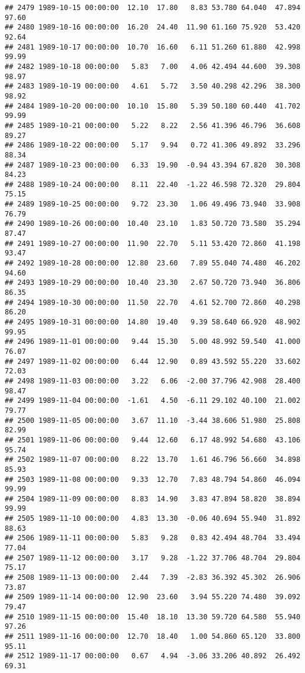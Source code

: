 \documentclass{article}\usepackage{graphicx, color}
\makeatletter
\newenvironment{kframe}{%
 \def\at@end@of@kframe{}%
 \ifinner\ifhmode%
  \def\at@end@of@kframe{\end{minipage}}%
  \begin{minipage}{\columnwidth}%
 \fi\fi%
 \def\FrameCommand##1{\hskip\@totalleftmargin \hskip-\fboxsep
 \colorbox{shadecolor}{##1}\hskip-\fboxsep
     \hskip-\linewidth \hskip-\@totalleftmargin \hskip\columnwidth}%
 \MakeFramed {\advance\hsize-\width
   \@totalleftmargin\z@ \linewidth\hsize
   \@setminipage}}%
 {\par\unskip\endMakeFramed%
 \at@end@of@kframe}
\newenvironment{knitrout}{}{} %
\makeatother
\begin{document}
\begin{knitrout}
\begin{kframe}
\begin{verbatim}
## 2479 1989-10-15 00:00:00  12.10  17.80   8.83 53.780 64.040  47.894  97.60
## 2480 1989-10-16 00:00:00  16.20  24.40  11.90 61.160 75.920  53.420  92.64
## 2481 1989-10-17 00:00:00  10.70  16.60   6.11 51.260 61.880  42.998  99.99
## 2482 1989-10-18 00:00:00   5.83   7.00   4.06 42.494 44.600  39.308  98.97
## 2483 1989-10-19 00:00:00   4.61   5.72   3.50 40.298 42.296  38.300  98.92
## 2484 1989-10-20 00:00:00  10.10  15.80   5.39 50.180 60.440  41.702  99.99
## 2485 1989-10-21 00:00:00   5.22   8.22   2.56 41.396 46.796  36.608  89.27
## 2486 1989-10-22 00:00:00   5.17   9.94   0.72 41.306 49.892  33.296  88.34
## 2487 1989-10-23 00:00:00   6.33  19.90  -0.94 43.394 67.820  30.308  84.23
## 2488 1989-10-24 00:00:00   8.11  22.40  -1.22 46.598 72.320  29.804  75.15
## 2489 1989-10-25 00:00:00   9.72  23.30   1.06 49.496 73.940  33.908  76.79
## 2490 1989-10-26 00:00:00  10.40  23.10   1.83 50.720 73.580  35.294  87.47
## 2491 1989-10-27 00:00:00  11.90  22.70   5.11 53.420 72.860  41.198  93.47
## 2492 1989-10-28 00:00:00  12.80  23.60   7.89 55.040 74.480  46.202  94.60
## 2493 1989-10-29 00:00:00  10.40  23.30   2.67 50.720 73.940  36.806  86.35
## 2494 1989-10-30 00:00:00  11.50  22.70   4.61 52.700 72.860  40.298  86.20
## 2495 1989-10-31 00:00:00  14.80  19.40   9.39 58.640 66.920  48.902  99.95
## 2496 1989-11-01 00:00:00   9.44  15.30   5.00 48.992 59.540  41.000  76.07
## 2497 1989-11-02 00:00:00   6.44  12.90   0.89 43.592 55.220  33.602  72.03
## 2498 1989-11-03 00:00:00   3.22   6.06  -2.00 37.796 42.908  28.400  98.47
## 2499 1989-11-04 00:00:00  -1.61   4.50  -6.11 29.102 40.100  21.002  79.77
## 2500 1989-11-05 00:00:00   3.67  11.10  -3.44 38.606 51.980  25.808  82.99
## 2501 1989-11-06 00:00:00   9.44  12.60   6.17 48.992 54.680  43.106  95.74
## 2502 1989-11-07 00:00:00   8.22  13.70   1.61 46.796 56.660  34.898  85.93
## 2503 1989-11-08 00:00:00   9.33  12.70   7.83 48.794 54.860  46.094  99.99
## 2504 1989-11-09 00:00:00   8.83  14.90   3.83 47.894 58.820  38.894  99.99
## 2505 1989-11-10 00:00:00   4.83  13.30  -0.06 40.694 55.940  31.892  88.63
## 2506 1989-11-11 00:00:00   5.83   9.28   0.83 42.494 48.704  33.494  77.04
## 2507 1989-11-12 00:00:00   3.17   9.28  -1.22 37.706 48.704  29.804  75.17
## 2508 1989-11-13 00:00:00   2.44   7.39  -2.83 36.392 45.302  26.906  73.87
## 2509 1989-11-14 00:00:00  12.90  23.60   3.94 55.220 74.480  39.092  79.47
## 2510 1989-11-15 00:00:00  15.40  18.10  13.30 59.720 64.580  55.940  97.26
## 2511 1989-11-16 00:00:00  12.70  18.40   1.00 54.860 65.120  33.800  95.11
## 2512 1989-11-17 00:00:00   0.67   4.94  -3.06 33.206 40.892  26.492  69.31

\end{verbatim}
\end{kframe}
\end{knitrout}
\end{document}
